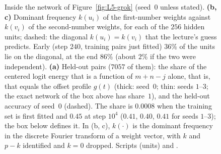 \begin{figure}[tb]
\caption{Inside the network of Figure~\ref{fig:L5-grok} (seed~0 unless stated). \textbf{(b, c)} Dominant frequency $k(u_i)$ of the first-number weights against $k(v_i)$ of the second-number weights, for each of the $256$ hidden units; dashed: the diagonal $k(u_i)=k(v_i)$ that the lecture's guess predicts. Early (step $240$, training pairs just fitted) $36\%$ of the units lie on the diagonal, at the end $86\%$ (about $2\%$ if the two were independent). \textbf{(a)} Held-out pairs ($7057$ of them): the share of the centered logit energy that is a function of $m+n-j$ alone, that is, that equals the offset profile $g(t)$ (thick: seed~$0$; thin: seeds $1$--$3$; the exact network of the box above has share~$1$), and the held-out accuracy of seed~$0$ (dashed). The share is $0.0008$ when the training set is first fitted and $0.45$ at step $10^4$ ($0.41$, $0.40$, $0.41$ for seeds $1$--$3$); the box below defines it. In (b, c), $k(\cdot)$ is the dominant frequency in the discrete Fourier transform of a weight vector, with $k$ and $p-k$ identified and $k=0$ dropped. Scripts  (units) and .}
\label{fig:L5-inside}
\end{figure}

